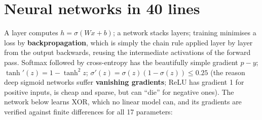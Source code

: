 \documentclass[10pt,a4paper,openany,oneside]{report}
\newcommand{\prio}[1]{\texorpdfstring{\ifcase#1\or{\color{gold}\ding{72}}\or{\color{gold}\ding{72}\ding{72}}\or{\color{gold}\ding{72}\ding{72}\ding{72}}\fi}{}}
\begin{document}
\section{Neural networks in 40 lines \prio{3}}
\label{sec:nn}
A layer computes $h=\sigma(Wx+b)$; a network stacks layers; training minimises a loss by \textbf{backpropagation}, which is simply the chain rule applied layer by layer from the output backwards, reusing the intermediate activations of the forward pass. Softmax followed by cross-entropy has the beautifully simple gradient $\hat p-y$; $\tanh'(z)=1-\tanh^2 z$; $\sigma'(z)=\sigma(z)(1-\sigma(z))\le0.25$ (the reason deep sigmoid networks suffer \textbf{vanishing gradients}; ReLU has gradient 1 for positive inputs, is cheap and sparse, but can ``die'' for negative ones). The network below learns XOR, which no linear model can, and its gradients are verified against finite differences for all 17 parameters:
\end{document}
